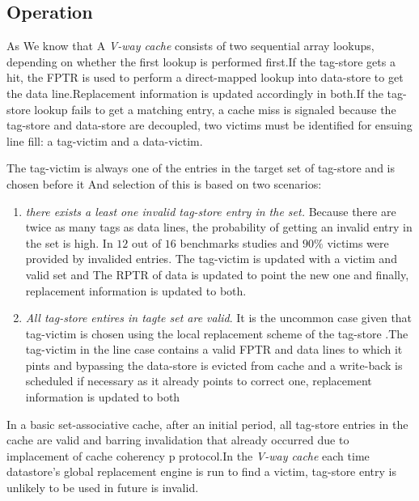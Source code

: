 \documentclass{report}
\begin{document}
\subsection{ Operation}

As We know that A \emph{V-way cache} consists of two sequential array lookups, depending on whether the first lookup is performed first.If the tag-store gets a hit, the FPTR is used to perform a direct-mapped lookup into data-store to get the data line.Replacement information is updated accordingly in both.If the tag-store lookup fails to get a matching entry, a cache miss is signaled because the tag-store and data-store are decoupled, two victims must be identified for ensuing line fill: a tag-victim and a data-victim.


\vspace{.8cm}
The tag-victim is always one of the entries in the target set of tag-store and is chosen before it And selection of this is based on two scenarios:
\begin{enumerate}

\vspace{.8cm}

\item \emph{there exists a least one invalid tag-store entry in the set.}
Because there are twice as many tags as data lines, the probability of getting an invalid entry in the set is high. In $12$ out of $16$ benchmarks studies and $90\%$ victims were provided by invalided entries. The tag-victim is updated with a victim and valid set and The RPTR of data is updated to point the new one and finally, replacement information is updated to both.


\item \emph{All tag-store entires in tagte set are valid}.
It is the uncommon case given that tag-victim is chosen using the local replacement scheme of the tag-store .The tag-victim in the line case contains a valid FPTR and data lines to which it pints and bypassing the data-store is evicted from cache and a write-back is scheduled if necessary  as it already points to correct one, replacement information is updated to both

\end{enumerate}
\vspace{.8cm}

In a basic set-associative cache, after an initial period, all tag-store entries in the cache are valid and barring invalidation that already occurred due to implacement of cache coherency p protocol.In the \emph{V-way cache} each time datastore's global replacement engine is run to find a victim, tag-store entry is unlikely to be used in future is invalid.
\end{document}

